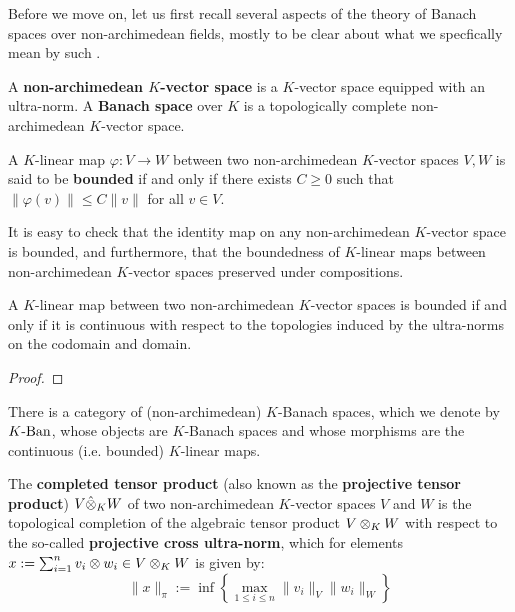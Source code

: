             Before we move on, let us first recall several aspects of the theory of Banach spaces over non-archimedean fields, mostly to be clear about what we specfically mean by such .
            \begin{definition} \label{def: non_archimedean_banach_spaces}
                A \textbf{non-archimedean $K$-vector space} is a $K$-vector space equipped with an ultra-norm. A \textbf{Banach space} over $K$ is a topologically complete non-archimedean $K$-vector space.
            \end{definition}
            \begin{definition} \label{def: bounded_linear_maps_between_non_archimedean_vector_spaces}
                A $K$-linear map $\varphi: V \to W$ between two non-archimedean $K$-vector spaces $V, W$ is said to be \textbf{bounded} if and only if there exists $C \geq 0$ such that $\|\varphi(v)\| \leq C \|v\|$ for all $v \in V$.
            \end{definition}
            \begin{remark}
                It is easy to check that the identity map on any non-archimedean $K$-vector space is bounded, and furthermore, that the boundedness of $K$-linear maps between non-archimedean $K$-vector spaces preserved under compositions.
            \end{remark}
            \begin{proposition}
                A $K$-linear map between two non-archimedean $K$-vector spaces is bounded if and only if it is continuous with respect to the topologies induced by the ultra-norms on the codomain and domain.
            \end{proposition}
                \begin{proof}
                    
                \end{proof}
            \begin{corollary}
                There is a category of (non-archimedean) $K$-Banach spaces, which we denote by $K\text{-}\mathrm{Ban}$, whose objects are $K$-Banach spaces and whose morphisms are the continuous (i.e. bounded) $K$-linear maps.
            \end{corollary}
            \begin{definition} \label{def: completed_tensor_products_of_non_archimedean_vector_spaces}
                The \textbf{completed tensor product} (also known as the \textbf{projective tensor product}) $V \hat\tensor_K W$ of two non-archimedean $K$-vector spaces $V$ and $W$ is the topological completion of the algebraic tensor product $V \tensor_K W$ with respect to the so-called \textbf{projective cross ultra-norm}, which for elements $x := \sum_{i = 1}^n v_i \tensor w_i \in V \tensor_K W$ is given by:
                    $$\|x\|_{\pi} := \inf\left\{ \max_{1 \leq i \leq n} \|v_i\|_V \|w_i\|_W \right\}$$
            \end{definition}
